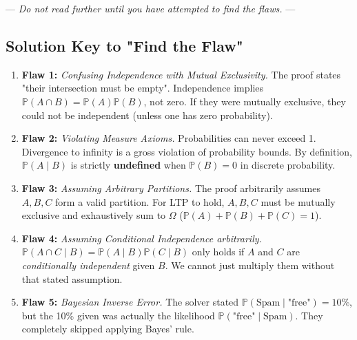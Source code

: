 \documentclass[12pt]{article}
\begin{document}
\vspace{2cm}
\begin{center}
    --- \textit{Do not read further until you have attempted to find the flaws.} ---
\end{center}
\vspace{1cm}

\subsection*{Solution Key to "Find the Flaw"}
\begin{enumerate}
    \item \textbf{Flaw 1:} \textit{Confusing Independence with Mutual Exclusivity.} The proof states "their intersection must be empty". Independence implies $\mathbb{P}(A \cap B) = \mathbb{P}(A)\mathbb{P}(B)$, not zero. If they were mutually exclusive, they could not be independent (unless one has zero probability).
    \item \textbf{Flaw 2:} \textit{Violating Measure Axioms.} Probabilities can never exceed 1. Divergence to infinity is a gross violation of probability bounds. By definition, $\mathbb{P}(A \mid B)$ is strictly \textbf{undefined} when $\mathbb{P}(B) = 0$ in discrete probability.
    \item \textbf{Flaw 3:} \textit{Assuming Arbitrary Partitions.} The proof arbitrarily assumes $A, B, C$ form a valid partition. For LTP to hold, $A, B, C$ must be mutually exclusive and exhaustively sum to $\Omega$ ($\mathbb{P}(A) + \mathbb{P}(B) + \mathbb{P}(C) = 1$).
    \item \textbf{Flaw 4:} \textit{Assuming Conditional Independence arbitrarily.} $\mathbb{P}(A \cap C \mid B) = \mathbb{P}(A \mid B)\mathbb{P}(C \mid B)$ only holds if $A$ and $C$ are \textit{conditionally independent} given $B$. We cannot just multiply them without that stated assumption.
    \item \textbf{Flaw 5:} \textit{Bayesian Inverse Error.} The solver stated $\mathbb{P}(\text{Spam} \mid \text{"free"}) = 10\%$, but the 10\% given was actually the likelihood $\mathbb{P}(\text{"free"} \mid \text{Spam})$. They completely skipped applying Bayes' rule.
\end{enumerate}
\end{document}
